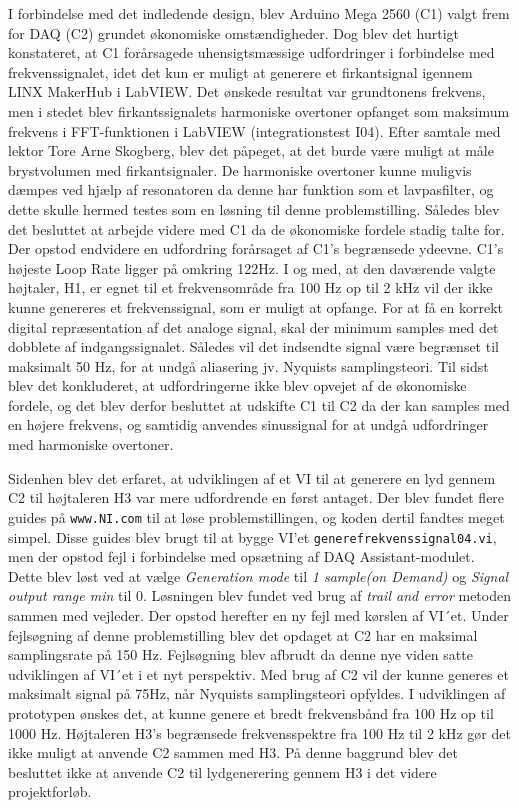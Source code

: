 I forbindelse med det indledende design, blev Arduino Mega 2560 (C1) valgt frem for DAQ (C2) grundet økonomiske omstændigheder. Dog blev det hurtigt konstateret, at C1 forårsagede uhensigtsmæssige udfordringer i forbindelse med frekvenssignalet, idet det kun er muligt at generere et firkantsignal igennem LINX MakerHub i LabVIEW. Det ønskede resultat var grundtonens frekvens, men i stedet blev firkantssignalets harmoniske overtoner opfanget som maksimum frekvens i FFT-funktionen i LabVIEW (integrationstest I04). Efter samtale med lektor Tore Arne Skogberg, blev det påpeget, at det burde være muligt at måle brystvolumen med firkantsignaler. De harmoniske overtoner kunne muligvis dæmpes ved hjælp af resonatoren da denne har funktion som et lavpasfilter, og dette skulle hermed testes som en løsning til denne problemstilling. Således blev det besluttet at arbejde videre med C1 da de økonomiske fordele stadig talte for. Der opstod endvidere en udfordring forårsaget af C1's begrænsede ydeevne. C1's højeste Loop Rate ligger på omkring 122Hz. I og med, at den daværende valgte højtaler, H1, er egnet til et frekvensområde fra 100 Hz op til 2 kHz vil der ikke kunne genereres et frekvenssignal, som er muligt at opfange. For at få en korrekt digital repræsentation af det analoge signal, skal der minimum samples med det dobblete af indgangssignalet. Således vil det indsendte signal være begrænset til maksimalt 50 Hz, for at undgå aliasering jv. Nyquists samplingsteori. Til sidst blev det konkluderet, at udfordringerne ikke blev opvejet af de økonomiske fordele, og det blev derfor besluttet at udskifte C1 til C2 da der kan samples med en højere frekvens, og samtidig anvendes sinussignal for at undgå udfordringer med harmoniske overtoner.      

Sidenhen blev det erfaret, at udviklingen af et VI til at generere en lyd gennem C2 til højtaleren H3 var mere udfordrende en først antaget. Der blev fundet flere guides på \texttt{www.NI.com} til at løse problemstillingen, og koden dertil fandtes meget simpel. Disse guides blev brugt til at bygge VI'et \texttt{generefrekvenssignal04.vi}, men der opstod fejl i forbindelse med opsætning af DAQ Assistant-modulet. Dette blev løst ved at vælge \textit{Generation mode} til \textit{1 sample(on Demand)} og \textit{Signal output range min} til 0. Løsningen blev fundet ved brug af \textit{trail and error} metoden sammen med vejleder. Der opstod herefter en ny fejl med kørslen af VI´et. Under fejlsøgning af denne problemstilling blev det opdaget at C2 har en maksimal samplingsrate på 150 Hz. Fejlsøgning blev afbrudt da denne nye viden satte udviklingen af VI´et i et nyt perspektiv. Med brug af C2 vil der kunne generes et maksimalt signal på 75Hz, når Nyquists samplingsteori opfyldes. I udviklingen af prototypen ønskes det, at kunne genere et bredt frekvensbånd fra 100 Hz op til 1000 Hz. Højtaleren H3's begrænsede frekvensspektre fra 100 Hz til 2 kHz  gør det ikke muligt at anvende C2 sammen med H3. 
På denne baggrund blev det besluttet ikke at anvende C2 til lydgenerering gennem H3 i det videre projektforløb. 

